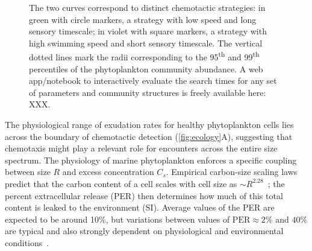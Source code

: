 \documentclass[9pt,twocolumn,twoside]{pnas-new}
\begin{document}
\begin{figure}
{        The two curves correspond to distinct chemotactic strategies: in green with circle markers, a strategy with low speed and long sensory timescale; in violet with square markers, a strategy with high swimming speed and short sensory timescale.
        The vertical dotted lines mark the radii corresponding to the 95\textsuperscript{th} and 99\textsuperscript{th} percentiles of the phytoplankton community abundance.
        {\color{magenta}A web app/notebook to interactively evaluate the search times for any set of parameters and community structures is freely available here: XXX.}
    }
    \label{fig:ecology}
\end{figure}



The physiological range of exudation rates for healthy phytoplankton cells lies across the boundary of chemotactic detection (\autoref{fig:ecology}A), suggesting that chemotaxis might play a relevant role for encounters across the entire size spectrum. The physiology of marine phytoplankton enforces a specific coupling between size $R$ and excess concentration $C_s$.
Empirical carbon-size scaling laws predict that the carbon content of a cell scales with cell size as $\sim R^{2.28}$~\cite{mullin1966relationship}; the percent extracellular release (PER) then determines how much of this total content is leaked to the environment (SI).
Average values of the PER are expected to be around 10\%, but variations between values of $\mathrm{PER}\approx 2\%$ and $40\%$ are typical and also strongly dependent on physiological and environmental conditions~\cite{maranon2004significance}.
\end{document}
